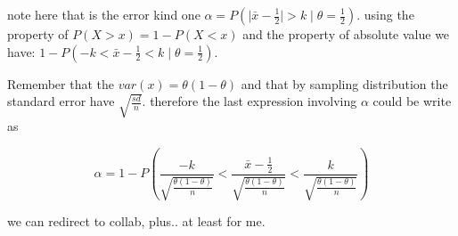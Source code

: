 \documentclass[10pt,a4paper]{article}
\begin{document}
note here that is the error kind one 
$\alpha = P(\vert \bar{x} - \frac{1}{2} \vert > k \mid \theta=\frac{1}{2}).$ using the property of $P(X>x) = 1 - P(X< x)$ and the property of absolute value we have:
$ 1 - P(-k < \bar{x}  - \frac{1}{2} < k \mid \theta = \frac{1}{2})$.

Remember that the $var(x) = \theta(1-\theta)$ and that by sampling distribution the standard error have $\sqrt{\frac{sd}{n}}$. therefore the last expression involving $\alpha$ could be write as 

\begin{equation}
\alpha = 1 - P\left(\frac{-k}{\sqrt{\frac{\theta(1-\theta)}{n}}} < \frac{\bar{x} - \frac{1}{2}}{\sqrt{\frac{\theta(1-\theta)}{n}}} <           
\frac{k}{\sqrt{\frac{\theta(1-\theta)}{n}}}
\right)
\end{equation}




we can redirect to collab, plus.. at least for me.
\end{document}
